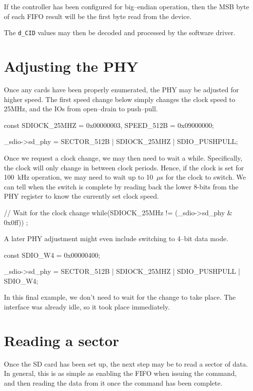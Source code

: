 \documentclass{gqtekspec}
\begin{document}
If the controller has been configured for big--endian operation, then
the MSB byte of each FIFO result will be the first byte read from the
device.

The {\tt d\_CID} values may then be decoded and processed by the software
driver.
\section{Adjusting the PHY}
Once any cards have been properly enumerated, the PHY may be adjusted
for higher speed.  The first speed change below simply changes the clock
speed to 25MHz, and the IOs from open--drain to push--pull.

\begin{zCpp}
	const	SDIOCK_25MHZ = 0x00000003,
		SPEED_512B   = 0x09000000;

	_sdio->sd_phy = SECTOR_512B | SDIOCK_25MHZ | SDIO_PUSHPULL;
\end{zCpp}

Once we request a clock change, we may then need to wait a while.  Specifically,
the clock will only change in between clock periods.  Hence, if the clock is
set for 100~kHz operation, we may need to wait up to 10~$\mu$s for the clock
to switch.  We can tell when the switch is complete by reading back the lower
8-bits from the PHY register to know the currently set clock speed.

\begin{zCpp}
	// Wait for the clock change
	while(SDIOCK_25MHz != (_sdio->sd_phy & 0x0ff))
		;
\end{zCpp}

A later PHY adjustment might even include switching to 4--bit data mode.

\begin{zCpp}
	const	SDIO_W4 = 0x00000400;

	_sdio->sd_phy = SECTOR_512B | SDIOCK_25MHZ | SDIO_PUSHPULL
				| SDIO_W4;
\end{zCpp}

In this final example, we don't need to wait for the change to take place.
The interface was already idle, so it took place immediately.
\section{Reading a sector}
Once the SD card has been set up, the next step may be to read a sector
of data.  In general, this is as simple as enabling the FIFO when issuing
the command, and then reading the data from it once the command has been
complete.
\end{document}
